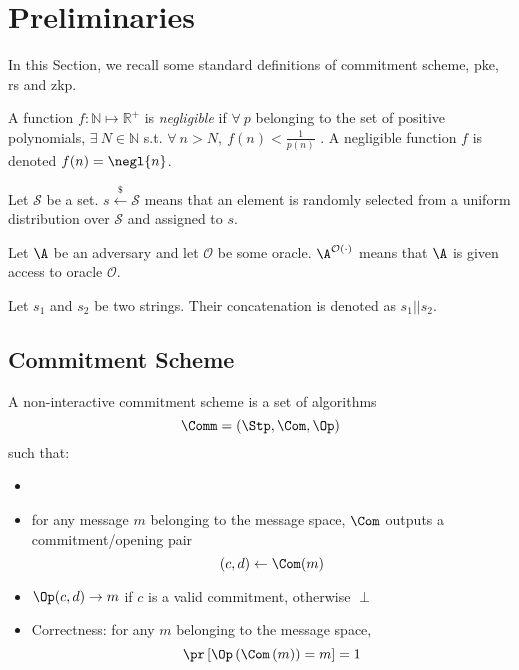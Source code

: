 \section{Preliminaries}
\label{sec-Preliminaries}
In this Section, we recall some standard definitions of commitment
scheme, \gls{pke}, \gls{rs} and \gls{zkp}. 
    
\begin{definition}
    A function $f:\mathbb{N} \mapsto \mathbb{R}^+$ is \emph{negligible} if $\forall ~p$ belonging to the set of positive polynomials, $\exists ~N \in \mathbb{N}$ s.t. $\forall ~n > N,~f(n) < \frac{1}{p(n)}$ \emph{\cite{katz2015introduction}}. A negligible function $f$ is denoted $f(n)=\negl{n}$.
\end{definition}

\begin{definition}
    Let $\mathcal{S}$ be a set. $s \overset{\$}{\leftarrow} \mathcal{S}$ means that an element is randomly selected from a uniform distribution over $\mathcal{S}$ and assigned to $s$.
\end{definition}

\begin{definition}
    Let $\A$ be an adversary and let $\mathcal{O}$ be some oracle. $\A^{\mathcal{O}(\cdot)}$ means that $\A$ is given access to oracle $\mathcal{O}$.
\end{definition}

\begin{definition}
    Let $s_1$ and $s_2$ be two strings. Their concatenation is denoted as $s_1 || s_2$.
\end{definition}

\subsection{Commitment Scheme}
A non-interactive commitment scheme is a set of algorithms
\begin{equation*}
    \Comm=(\Stp,\Com, \Op)
\end{equation*}
such that:
\begin{itemize}
\item {}
\item for any message $m$ belonging to the message space, $\Com$ outputs a commitment/opening pair
  \begin{equation*}
    (c,d) \gets \Com(m)    
  \end{equation*}
\item $\Op(c,d) \to m$ if $c$ is a valid commitment, otherwise
  $\perp$
\item Correctness: for any $m$ belonging to the message space, 
\begin{equation*}
    \pr\left[\Op\left(\Com\left(m\right)\right)=m\right] = 1
\end{equation*}
\end{itemize}

